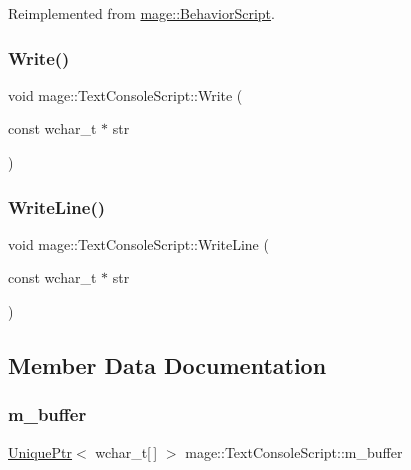 Reimplemented from \hyperlink{classmage_1_1_behavior_script_ae42e869ca8d4e4b3ad2af589b0ca9924}{mage\+::\+Behavior\+Script}.

\hypertarget{classmage_1_1_text_console_script_a659586a498f8ff0f55aa2a3f25f0828b}{}\label{classmage_1_1_text_console_script_a659586a498f8ff0f55aa2a3f25f0828b} 
\subsubsection{\texorpdfstring{Write()}{Write()}}
{\footnotesize\ttfamily void mage\+::\+Text\+Console\+Script\+::\+Write (\begin{DoxyParamCaption}\item[{const wchar\+\_\+t $\ast$}]{str }\end{DoxyParamCaption})}

\hypertarget{classmage_1_1_text_console_script_a24fe33795c69e70d07a680826cfafcc1}{}\label{classmage_1_1_text_console_script_a24fe33795c69e70d07a680826cfafcc1} 
\subsubsection{\texorpdfstring{Write\+Line()}{WriteLine()}}
{\footnotesize\ttfamily void mage\+::\+Text\+Console\+Script\+::\+Write\+Line (\begin{DoxyParamCaption}\item[{const wchar\+\_\+t $\ast$}]{str }\end{DoxyParamCaption})}



\subsection{Member Data Documentation}
\hypertarget{classmage_1_1_text_console_script_a526410b1b43646948809b772c5446346}{}\label{classmage_1_1_text_console_script_a526410b1b43646948809b772c5446346} 
\subsubsection{\texorpdfstring{m\+\_\+buffer}{m\_buffer}}
{\footnotesize\ttfamily \hyperlink{namespacemage_a3316d7143a973e37adf1110f2e80ca31}{Unique\+Ptr}$<$ wchar\+\_\+t\mbox{[}$\,$\mbox{]} $>$ mage\+::\+Text\+Console\+Script\+::m\+\_\+buffer\hspace{0.3cm}{\ttfamily [private]}}

